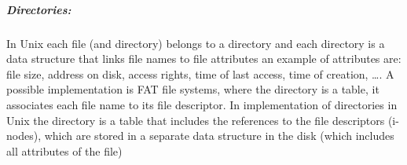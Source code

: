 \documentclass{article}
\begin{document}
                            \subparagraph{Directories:} In Unix each file (and directory) belongs to a
                            directory and each directory is a data structure that links
                            file names to file attributes an example of attributes are: file size, address
                            on disk, access rights, time of last
                            access, time of creation, \dots. A possible implementation is FAT file systems, where the directory is a table, it associates
                            each file name to its file descriptor. In implementation of directories in Unix the directory is a table that includes the
                            references to the file descriptors (i-nodes), which
                            are stored in a separate data structure in the disk
                            (which includes all attributes of the file)
\end{document}
